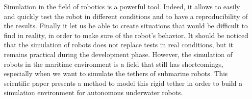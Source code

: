 Simulation in the field of robotics is a powerful tool. Indeed, it allows to easily and quickly test the robot in different conditions and to have a reproducibility of the results. Finally it let us be able to create situations that would be difficult to find in reality, in order to make sure of the robot's behavior. It should be noticed that the simulation of robots does not replace tests in real conditions, but it remains practical during the development phase. However, the simulation of robots in the maritime environment is a field that still has shortcomings, especially when we want to simulate the tethers of submarine robots. This scientific paper presents a method to model this rigid tether in order to build a simulation environment for autonomous underwater robots.